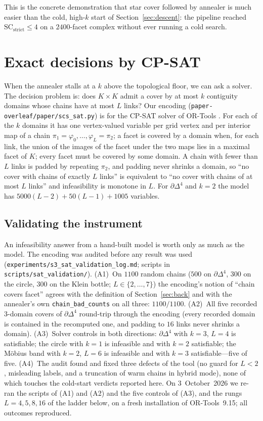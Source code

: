 \documentclass[12pt]{article}
\newcommand{\SC}{\mathrm{SC}}
\newcommand{\SCst}{\SC_{\mathrm{strict}}}
\begin{document}
This is the concrete demonstration that star cover followed by annealer
is much easier than the cold, high-$k$ start of Section~\ref{sec:descent}:
the pipeline reached $\SCst\le4$ on a $2400$-facet complex without ever
running a cold search.

\section{Exact decisions by CP-SAT}\label{sec:sat}

When the annealer stalls at a $k$ above the topological floor, we can
ask a solver.  The decision problem is: does $K\times K$ admit a cover
by at most $k$ contiguity domains whose chains have at most $L$ links?
Our encoding (\texttt{paper-overleaf/paper/scs\_sat.py}) is for the
CP-SAT solver of OR-Tools \cite{ORTools}.  For each of the $k$ domains
it has one vertex-valued variable per grid vertex and per interior map
of a chain $\pi_1=\varphi_0,\dots,\varphi_L=\pi_2$; a facet is covered
by a domain when, for each link, the union of the images of the facet
under the two maps lies in a maximal facet of $K$; every facet must be
covered by some domain.  A chain with fewer than $L$ links is padded by
repeating $\pi_2$, and padding never shrinks a domain, so ``no cover with
chains of exactly $L$ links'' is equivalent to ``no cover with chains of
at most $L$ links'' and infeasibility is monotone in $L$.  For
$\partial\Delta^4$ and $k=2$ the model has
$5000(L-2)+50(L-1)+1005$ variables.

\subsection{Validating the instrument}

An infeasibility answer from a hand-built model is worth only as much as
the model.  The encoding was audited before any result was used
(\texttt{experiments/}\allowbreak\texttt{s3\_sat\_validation\_log.md}; scripts in
\texttt{scripts/}\allowbreak\texttt{sat\_validation/}).
(A1)~On $1100$ random chains ($500$ on $\partial\Delta^4$, $300$ on the
circle, $300$ on the Klein bottle; $L\in\{2,\dots,7\}$) the encoding's
notion of ``chain covers facet'' agrees with the definition of
Section~\ref{sec:back} and with the annealer's own
\texttt{chain\_bad\_counts} on all three: $1100/1100$.
(A2)~All five recorded $3$-domain covers of $\partial\Delta^4$ round-trip
through the encoding (every recorded domain is contained in the
recomputed one, and padding to $16$ links never shrinks a domain).
(A3)~Solver controls in both directions: $\partial\Delta^4$ with
$k=3$, $L=4$ is satisfiable; the circle with $k=1$ is infeasible and with
$k=2$ satisfiable; the M\"obius band with $k=2$, $L=6$ is infeasible and
with $k=3$ satisfiable---five of five.  (A4)~The audit found and fixed
three defects of the tool (no guard for $L<2$, misleading labels, and a
truncation of warm chains in hybrid mode), none of which touches the
cold-start verdicts reported here.  On 3~October~2026 we re-ran the scripts of (A1) and (A2) and the
five controls of (A3), and the rungs $L=4,5,8,16$ of the ladder below, on a
fresh installation of OR-Tools~9.15; all outcomes reproduced.
\end{document}
